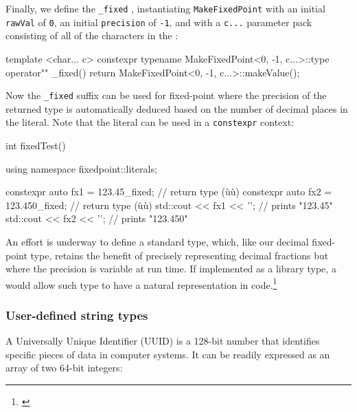 Finally, we define the \lstinline!_fixed! ,
instantiating \lstinline!MakeFixedPoint! with an initial \lstinline!rawVal! of
\lstinline!0!, an initial \lstinline!precision! of \lstinline!-1!, and with a \lstinline!c...!
parameter pack consisting of all of the characters in the :

\begin{emcppslisting}
template <char... c>
constexpr typename MakeFixedPoint<0, -1, c...>::type operator"" _fixed()
{
    return MakeFixedPoint<0, -1, c...>::makeValue();
}
\end{emcppslisting}
    
\noindent Now the \lstinline!_fixed! suffix can be used for fixed-point
 where the precision of the returned type is automatically
deduced based on the number of decimal places in the literal. Note that
the literal can be used in a \lstinline!constexpr! context:

\begin{emcppslisting}
int fixedTest()
{
    using namespace fixedpoint::literals;

    constexpr auto fx1 = 123.45_fixed;   // return type (ù{}ù)
    constexpr auto fx2 = 123.450_fixed;  // return type (ù{}ù)
    std::cout << fx1 << '\n';       // prints "123.45"
    std::cout << fx2 << '\n';       // prints "123.450"
}
\end{emcppslisting}
    
\noindent An effort is underway to define a standard  type, which, like our decimal fixed-point type, retains
the benefit of precisely representing decimal fractions but where the
precision is variable at run time. If implemented as a library type, a
 would allow such type to have a natural
representation in code.\footnote{\cite{kuhl12}}

\subsubsection[User-defined string types]{User-defined string types}\label{user-defined-string-types}

A Universally Unique Identifier (UUID) is a 128-bit number that
identifies specific pieces of data in computer systems. It can be
readily expressed as an array of two 64-bit integers:

